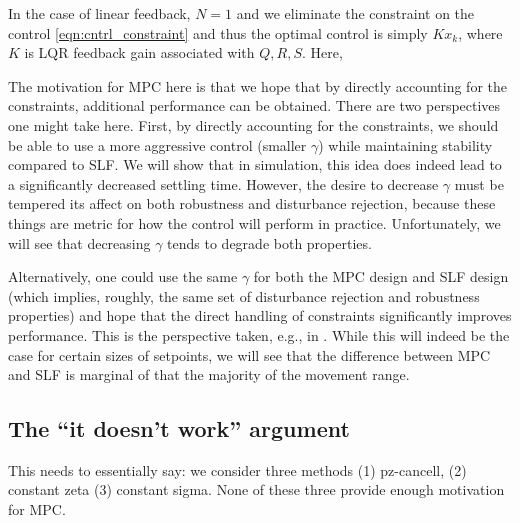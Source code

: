 \documentclass[journal,twocolumn,twoside]{IEEEtran}
\begin{document}
In the case of linear feedback, $N=1$ and we eliminate the constraint on the control \eqref{eqn:cntrl_constraint} and thus the optimal control is simply $Kx_k$, where $K$ is LQR feedback gain associated with $Q, R,S$. Here, 

The motivation for MPC here is that we hope that by directly accounting for the constraints, additional performance can be obtained. There are two perspectives one might take here. First, by directly accounting for the constraints, we should be able to use a more aggressive control (smaller $\gamma$) while maintaining stability compared to SLF.
We will show that in simulation, this idea does indeed lead to a significantly decreased settling time. However, the desire to decrease $\gamma$ must be tempered its affect on both robustness and disturbance rejection, because these things are metric for how the control will perform in practice. Unfortunately, we will see that decreasing $\gamma$ tends to degrade both properties. 

Alternatively, one could use the same $\gamma$ for both the MPC design and SLF design (which implies, roughly,  the same set of disturbance rejection and robustness properties) and hope that the direct handling of constraints significantly improves performance. This is the perspective taken, e.g., in \cite{Wills_CDC_2005}. While this will indeed be the case for certain sizes of setpoints, we will see that the difference between MPC and SLF is marginal of that the majority of the movement range.

\subsection{The ``it doesn't work'' argument}
This needs to essentially say: we consider three methods (1) pz-cancell, (2) constant zeta (3) constant sigma. None of these three provide enough motivation for MPC.
\end{document}
